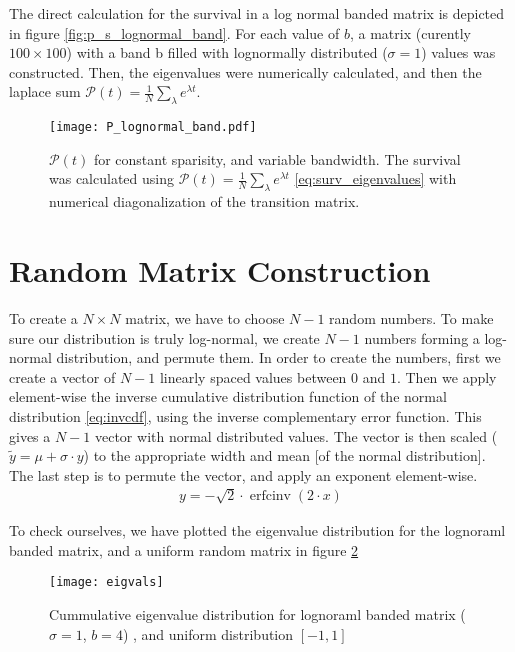 \documentclass[onecolumn,fleqn]{revtex4}
\begin{document}
The direct calculation for the survival in a log normal banded matrix is depicted in figure \ref{fig:p_s_lognormal_band}. For each value of $b$, a matrix (curently $100
\times 100$) with a band b filled with lognormally distributed ($\sigma=1$) values was constructed. Then, the eigenvalues were numerically calculated, and then the laplace sum $\mathcal{P}(t) =\frac{1}{N}\sum_\lambda e^{\lambda t}$.
\begin{figure}
\texttt{[image: P\_lognormal\_band.pdf]}
\caption{$\mathcal{P}(t)$ for constant sparisity, and variable bandwidth. The survival was calculated using $\mathcal{P}(t) =\frac{1}{N}\sum_\lambda e^{\lambda t}$ \eqref{eq:surv_eigenvalues} with numerical diagonalization of the transition matrix.
}
\label{fig:p_lognormal_band}
\end{figure}


\section{Random Matrix Construction}\label{sec:matrix_construction}
To create a $N\times N$ matrix, we have to choose $N-1$ random numbers. To make sure our distribution is truly log-normal, we create $N-1$ numbers forming a log-normal distribution, and permute them. In order to create the numbers, first we create a vector of $N-1$ linearly spaced values between $0$ and $1$. Then we apply element-wise the inverse cumulative distribution function of the normal distribution \ref{eq:invcdf}, using the inverse complementary error function. This gives a $N-1$ vector with normal distributed values. The vector is then scaled ($\tilde{y} = \mu+\sigma\cdot y$) to the appropriate width and mean [of the normal distribution]. The last step is to permute the vector, and apply an exponent element-wise.
\begin{align}\label{eq:invcdf}
y = -\sqrt{2}\cdot\operatorname{erfcinv}(2\cdot x) 
\end{align}

To check ourselves, we have plotted the eigenvalue distribution for the lognoraml banded matrix, and a uniform random matrix in figure \ref{fig:eigenvalue_distribution}
\begin{figure}
    \texttt{[image: eigvals]}
    \caption{Cummulative eigenvalue distribution for lognoraml banded matrix ($\sigma=1$, $b=4$) , and uniform distribution $[-1,1]$}
    \label{fig:eigenvalue_distribution}
\end{figure}
\end{document}
